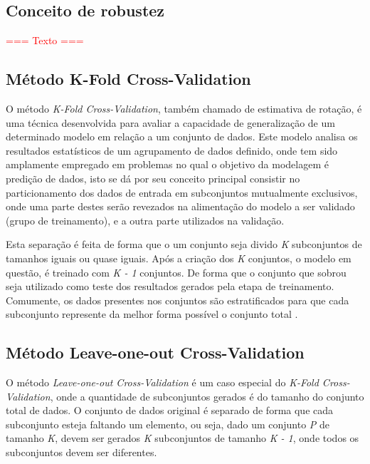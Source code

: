 \subsection{Conceito de robustez}
\textcolor{red}{=== Texto ===}


\subsection{Método K-Fold Cross-Validation}


O método \textsl{K-Fold Cross-Validation}, também chamado de estimativa de rotação, é uma técnica desenvolvida para avaliar a capacidade de generalização de um determinado modelo em relação a um conjunto de dados. Este modelo analisa os resultados estatísticos de um agrupamento de dados definido, onde tem sido amplamente empregado em problemas no qual o objetivo da modelagem é  predição de dados, isto se dá por seu conceito principal consistir no particionamento dos dados de entrada em subconjuntos mutualmente exclusivos, onde uma parte destes serão revezados na alimentação do modelo a ser validado (grupo de treinamento), e a outra parte utilizados na validação.
%

Esta separação é feita de forma que o um conjunto seja divido \textsl{K} subconjuntos de tamanhos iguais ou quase iguais. Após a criação dos \textsl{K} conjuntos, o modelo em questão, é treinado com \textsl{K - 1} conjuntos. De forma que o conjunto que sobrou seja utilizado como teste dos resultados gerados pela etapa de treinamento. Comumente, os dados presentes nos conjuntos são estratificados para que cada subconjunto represente da melhor forma possível o conjunto total \cite{Mudry2011}. 
%

\subsection{Método Leave-one-out Cross-Validation}

O método \textsl{Leave-one-out Cross-Validation} é um caso especial do \textsl{K-Fold Cross-Validation}, onde a quantidade de subconjuntos gerados é do tamanho do conjunto total de dados. O conjunto de dados original é separado de forma que cada subconjunto esteja faltando um elemento, ou seja, dado um conjunto \textsl{P} de tamanho \textsl{K}, devem ser gerados \textsl{K} subconjuntos de tamanho \textsl{K - 1}, onde todos os subconjuntos devem ser diferentes.
%

